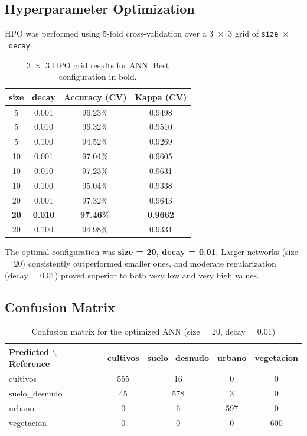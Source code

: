 \documentclass[12pt,a4paper]{article}
\begin{document}
\subsection{Hyperparameter Optimization}

HPO was performed using 5-fold cross-validation over a 3~$\times$~3 grid of \texttt{size}~$\times$~\texttt{decay}:

\begin{table}[H]
\centering
\begin{tabular}{|c|c|c|c|}
\hline
\textbf{size} & \textbf{decay} & \textbf{Accuracy (CV)} & \textbf{Kappa (CV)} \\
\hline
 5 & 0.001 & 96.23\% & 0.9498 \\
 5 & 0.010 & 96.32\% & 0.9510 \\
 5 & 0.100 & 94.52\% & 0.9269 \\
10 & 0.001 & 97.04\% & 0.9605 \\
10 & 0.010 & 97.23\% & 0.9631 \\
10 & 0.100 & 95.04\% & 0.9338 \\
20 & 0.001 & 97.32\% & 0.9643 \\
\textbf{20} & \textbf{0.010} & \textbf{97.46\%} & \textbf{0.9662} \\
20 & 0.100 & 94.98\% & 0.9331 \\
\hline
\end{tabular}
\caption{3~$\times$~3 HPO grid results for ANN. Best configuration in bold.}
\end{table}

The optimal configuration was \textbf{size = 20, decay = 0.01}. Larger networks (size = 20) consistently outperformed smaller ones, and moderate regularization (decay = 0.01) proved superior to both very low and very high values.

\subsection{Confusion Matrix}

\begin{table}[H]
\centering
\begin{tabular}{|l|c|c|c|c|}
\hline
\textbf{Predicted $\backslash$ Reference} & \textbf{cultivos} & \textbf{suelo\_desnudo} & \textbf{urbano} & \textbf{vegetacion} \\
\hline
cultivos       & 555 & 16 & 0 & 0 \\
\hline
suelo\_desnudo &  45 & 578 & 3 & 0 \\
\hline
urbano         &   0 &  6 & 597 & 0 \\
\hline
vegetacion     &   0 &  0 &  0 & 600 \\
\hline
\end{tabular}
\caption{Confusion matrix for the optimized ANN (size = 20, decay = 0.01)}
\end{table}
\end{document}
